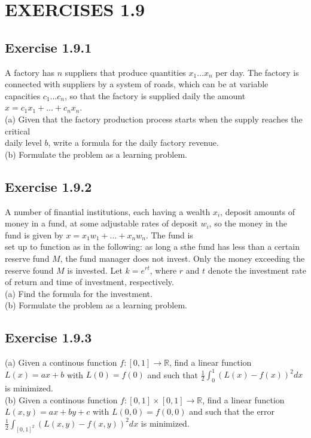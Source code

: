 \documentclass{report}
\begin{document}
\chapter*{EXERCISES 1.9}

\section*{Exercise 1.9.1}


A factory has $n$ suppliers that produce quantities $x_1 \dots x_n$ per day. The factory is connected with suppliers by a system of roads, which
can be at variable capacities $c_1 \dots c_n$, so that the factory is supplied
daily the amount $x = c_1 x_1 + \dots + c_n x_n$.\\
(a) Given that the factory production process starts when the supply reaches the critical \\ 
daily level $b$, write a formula for the daily factory revenue.\\
(b) Formulate the problem as a learning problem.

\section*{Exercise 1.9.2}


A number of finantial institutions, each having a wealth $x_i$, deposit amounts of money in a fund, at some adjustable rates of 
deposit $w_i$, so the money in the fund is given by $x = x_1 w_1 + \dots + x_n w_n$. The fund is \\
set up to function as in the following: as long a sthe fund has less than a certain reserve fund $M$, the fund manager does not invest. Only the
money exceeding the reserve found $M$ is invested. Let $k = e ^ {r t}$, where $r$ and $t$ denote the investment rate of return and time of investment, respectively.\\
(a) Find the formula for the investment. \\
(b) Formulate the problem as a learning problem.

\section*{Exercise 1.9.3}


(a) Given a continous function $f: [0,1] \rightarrow \mathbb{R}$, find a linear function $L(x) = ax + b$ with $L(0) = f(0)$ and such that 
$\frac{1}{2} \int^{1}_{0}(L(x) - f(x))^2 dx$ is minimized.\\
(b) Given a continous function $f: [0,1] \times [0,1] \rightarrow \mathbb{R}$, find a linear function $L(x,y) = ax + by + c$ with $L(0,0) = f(0,0)$ and 
such that the error $\frac{1}{2} \int_{[0,1]^2}(L(x,y) - f(x,y))^2 dx$ is minimized.
\end{document}
